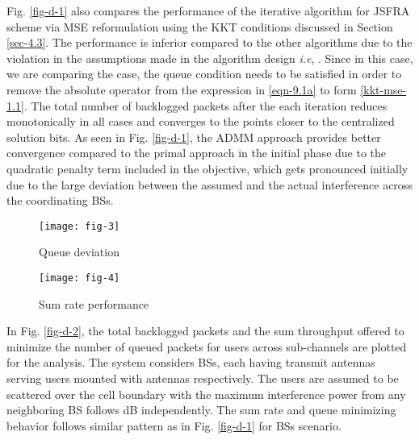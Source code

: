 Fig. \ref{fig-d-1} also compares the performance of the iterative algorithm for \ac{JSFRA} scheme via \ac{MSE} reformulation using the \ac{KKT} conditions discussed in Section \ref{sec-4.3}. The performance is inferior compared to the other algorithms due to the violation in the assumptions made in the algorithm design \textit{i.e}, . Since in this case, we are comparing the  case, the queue condition  needs to be satisfied in order to remove the absolute operator from the expression in \eqref{eqn-9.1a} to form \eqref{kkt-mse-1.1}. The total number of backlogged packets after the each iteration reduces monotonically in all cases and converges to the points closer to the centralized solution  bits. As seen in Fig. \ref{fig-d-1}, the \ac{ADMM} approach provides better convergence compared to the primal approach in the initial phase due to the quadratic penalty term included in the objective, which gets pronounced initially due to the large deviation between the assumed and the actual interference across the coordinating \acp{BS}.
\begin{figure*}
\centering
\begin{subfigure}{0.49\textwidth}
\texttt{[image: fig-3]}
\caption{Queue deviation}
\label{fig-d-1.1}
\end{subfigure}
\hfill
\begin{subfigure}{0.49\textwidth}
\texttt{[image: fig-4]}
\caption{Sum rate performance}
\label{fig-d-1.2}
\end{subfigure}
\caption[short]{Convergence plot for  model}
\label{fig-d-1}
\end{figure*}

In Fig. \ref{fig-d-2}, the total backlogged packets and the sum throughput offered to minimize the number of queued packets for  users across  sub-channels are plotted for the analysis. The system considers  \acp{BS}, each having  transmit antennas serving  users mounted with  antennas respectively. The users are assumed to be scattered over the cell boundary with the maximum interference power from any neighboring \ac{BS} follows  dB independently. The sum rate and queue minimizing behavior follows similar pattern as in Fig. \ref{fig-d-1} for  \acp{BS} scenario.

